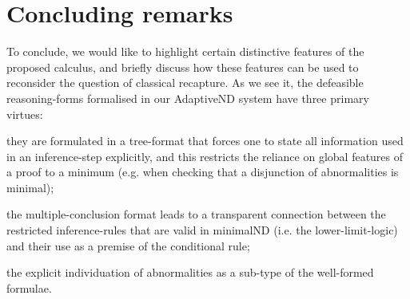 \documentclass[]{article}
\begin{document}
\section{Concluding remarks}\label{sec:recap}
To conclude, we would like to highlight certain distinctive features of the proposed calculus, and briefly discuss how these features can be used to reconsider the question of classical recapture. As we see it, the defeasible reasoning-forms formalised in our \textsf{AdaptiveND} system have three primary virtues:
\begin{enumerate*}
    \item they are formulated in a tree-format that forces one to state all information used in an inference-step explicitly, and this restricts the reliance on global features of a proof to a minimum (e.g. when checking that a disjunction of abnormalities is minimal);
    \item the multiple-conclusion format leads to a transparent connection between the restricted inference-rules that are valid in \textsf{minimalND} (i.e. the lower-limit-logic) and their use as a premise of the conditional rule;
    \item the explicit individuation of abnormalities as a sub-type of the well-formed formulae.
\end{enumerate*}
\end{document}
